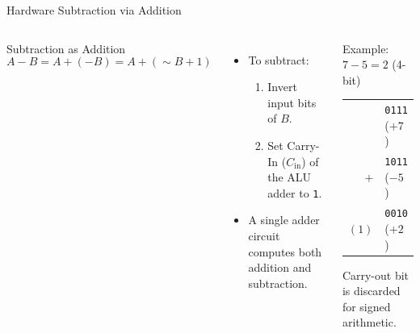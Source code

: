 \documentclass[aspectratio=169,11pt]{beamer}
\newcommand{\bits}[1]{\texttt{#1}}
\begin{document}

\begin{frame}{Hardware Subtraction via Addition}

\begin{columns}[T,onlytextwidth]

\begin{block}{Subtraction as Addition}
$$A - B = A + (-B) = A + (\sim B + 1)$$
\end{block}

\begin{itemize}
  \item To subtract:
  \begin{enumerate}
    \item Invert input bits of $B$.
    \item Set Carry-In ($C_{\text{in}}$) of the ALU adder to \bits{1}.
  \end{enumerate}
  \item A single adder circuit computes both addition and subtraction.
\end{itemize}

\begin{block}{Example: $7 - 5 = 2$ (4-bit)}
\begin{center}
\begin{tabular}{r@{\;}l}
  & \bits{0111} \; ($+7$) \\
$+$ & \bits{1011} \; ($-5$) \\
\midrule
$(1)$ & \bits{0010} \; ($+2$)
\end{tabular}
\end{center}
Carry-out bit is discarded for signed arithmetic.
\end{block}

\end{columns}

\end{frame}

\end{document}
